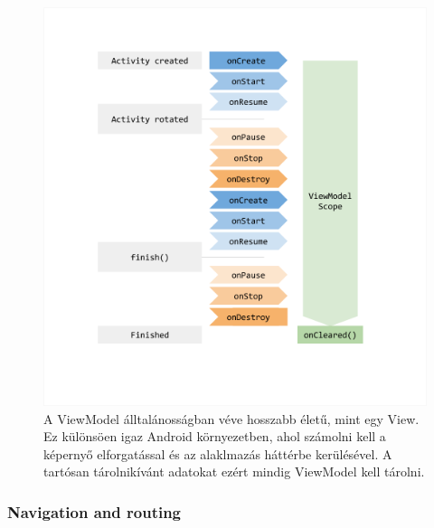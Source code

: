 \begin{figure}[!ht]
    \centering
    \includegraphics[width=150mm, keepaspectratio]{figures/viewmodel-lifecycle.png}
    \caption{A ViewModel álltalánosságban véve hosszabb életű, mint egy View. Ez különsöen igaz Android környezetben, ahol számolni kell a képernyő elforgatással és az alaklmazás háttérbe kerülésével. A tartósan tárolnikívánt adatokat ezért mindig ViewModel kell tárolni. \cite{ViewModelAndroid}}
    \label{fig:ViewModel}
\end{figure}

\subsubsection{Navigation and routing}
\label{sec:Navigation}

